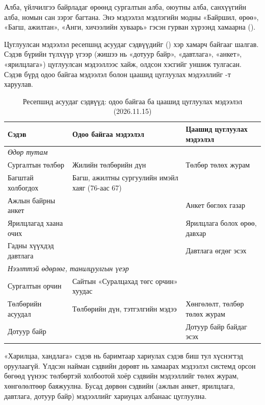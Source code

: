 Алба, үйлчилгээ байрладаг өрөөнд сургалтын алба, оюутны алба, санхүүгийн алба, номын сан зэрэг багтана. Энэ мэдээлэл мэдлэгийн модны «Байршил, өрөө», «Багш, ажилтан», «Анги, хичээлийн хуваарь» гэсэн гурван хүрээнд хамаарна ().

Цуглуулсан мэдээлэл ресепшнд асуудаг сэдвүүдийг () хэр хамарч байгааг шалгав. Сэдэв бүрийн түлхүүр үгээр (жишээ нь «дотуур байр», «давтлага», «анкет», «ярилцлага») цуглуулсан мэдээллээс хайж, олдсон хэсгийг уншиж тулгасан. Сэдэв бүрд одоо байгаа мэдээлэл болон цаашид цуглуулах мэдээллийг -т харуулав.

\begin{table}[htbp]
\centering
\caption{Ресепшнд асуудаг сэдвүүд: одоо байгаа ба цаашид цуглуулах мэдээлэл (2026.11.15)}
\label{tab:topic_coverage}
\begin{tabular}{|p{3.9cm}|p{5.3cm}|p{4.6cm}|}
\hline
\textbf{Сэдэв} & \textbf{Одоо байгаа мэдээлэл} & \textbf{Цаашид цуглуулах мэдээлэл} \\
\hline
\multicolumn{3}{|l|}{\textit{Өдөр тутам}} \\
\hline
Сургалтын төлбөр & Жилийн төлбөрийн дүн & Төлбөр төлөх журам \\
\hline
Багштай холбогдох & Багш, ажилтны сургуулийн имэйл хаяг (76-аас 67) & \\
\hline
Ажлын байрны анкет & & Анкет бөглөх газар \\
\hline
Ярилцлагад хаана очих & & Ярилцлага болох өрөө, давхар \\
\hline
Гадны хүүхдэд давтлага & & Давтлага өгдөг эсэх \\
\hline
\multicolumn{3}{|l|}{\textit{Нээлттэй өдөрлөг, танилцуулгын үеэр}} \\
\hline
Сургалтын орчин & Сайтын «Суралцахад төгс орчин» хуудас & \\
\hline
Төлбөрийн асуудал & Төлбөрийн дүн, тэтгэлгийн мэдээ & Хөнгөлөлт, төлбөр төлөх журам \\
\hline
Дотуур байр & & Дотуур байр байдаг эсэх \\
\hline
\end{tabular}
\end{table}

«Харилцаа, хандлага» сэдэв нь баримтаар хариулах сэдэв биш тул хүснэгтэд оруулаагүй. Үлдсэн найман сэдвийн дөрөвт нь хамаарах мэдээлэл системд орсон бөгөөд үүнээс төлбөртэй холбоотой хоёр сэдвийн мэдээллийг төлөх журам, хөнгөлөлтөөр баяжуулна. Бусад дөрвөн сэдвийн (ажлын анкет, ярилцлага, давтлага, дотуур байр) мэдээллийг хариуцах албанаас цуглуулна.

